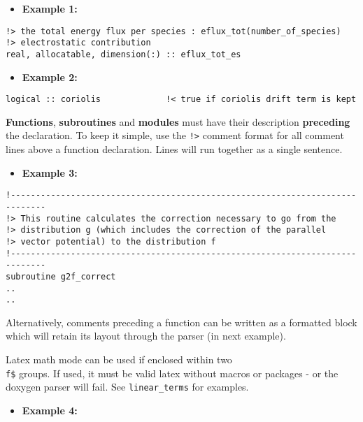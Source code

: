 \documentclass[12pt,twoside,notitlepage,a4paper]{article}
\begin{document}
\begin{itemize}
\item 
\textbf{Example 1:}\end{itemize}


\begin{verbatim}
!> the total energy flux per species : eflux_tot(number_of_species) 
!> electrostatic contribution 
real, allocatable, dimension(:) :: eflux_tot_es 
\end{verbatim}

\begin{itemize}
\item 
\textbf{Example 2:}\end{itemize}


\begin{verbatim}
logical :: coriolis             !< true if coriolis drift term is kept 
\end{verbatim}

\textbf{Functions}, \textbf{subroutines} and \textbf{modules} must have their description \textbf{preceding} the declaration. To keep it simple, use the \texttt{!>} comment format for all comment lines above a function declaration.  Lines will run together as a single sentence.

\begin{itemize}
\item 
\textbf{Example 3:}\end{itemize}


\begin{verbatim}
!-----------------------------------------------------------------------------
!> This routine calculates the correction necessary to go from the
!> distribution g (which includes the correction of the parallel
!> vector potential) to the distribution f
!-----------------------------------------------------------------------------
subroutine g2f_correct
..
..
\end{verbatim}

Alternatively, comments preceding a function can be written as a formatted block which will retain its layout through the parser (in next example).

Latex math mode can be used if enclosed within two \texttt{\\f\$} groups.  If used, it must
be valid latex without macros or packages - or the doxygen parser will fail.  See
\texttt{linear\_terms} for examples.

\begin{itemize}
\item 
\textbf{Example 4:}\end{itemize}
\end{document}
